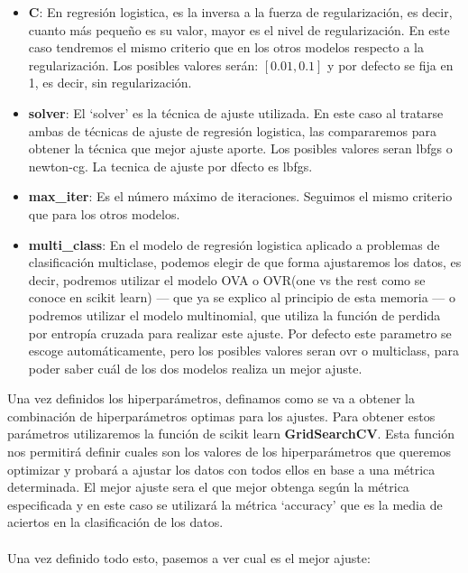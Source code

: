 \begin{itemize}
   \begin{itemize}
      \item \textbf{C}: En regresión logistica, es la inversa a la fuerza de regularización, es decir, cuanto más pequeño es su valor, mayor es el nivel de regularización. En este caso tendremos el mismo criterio que en los otros modelos respecto a la regularización. Los posibles valores serán: $[0.01, 0.1]$ y por defecto se fija en 1, es decir, sin regularización.
      \item \textbf{solver}: El `solver' es la técnica de ajuste utilizada. En este caso al tratarse ambas de técnicas de ajuste de regresión logistica, las compararemos para obtener la técnica que mejor ajuste aporte. Los posibles valores seran lbfgs o newton-cg. La tecnica de ajuste por dfecto es lbfgs.
      \item \textbf{max\_iter}: Es el número máximo de iteraciones. Seguimos el mismo criterio que para los otros modelos.
      \item \textbf{multi\_class}: En el modelo de regresión logistica aplicado a problemas de clasificación multiclase, podemos elegir de que forma ajustaremos los datos, es decir, podremos utilizar el modelo OVA o OVR(one vs the rest como se conoce en scikit learn) --- que ya se explico al principio de esta memoria --- o podremos utilizar el modelo multinomial, que utiliza la función de perdida por entropía cruzada para realizar este ajuste. Por defecto este parametro se escoge automáticamente, pero los posibles valores seran ovr o multiclass, para poder saber cuál de los dos modelos realiza un mejor ajuste.
   \end{itemize}
\end{itemize}

Una vez definidos los hiperparámetros, definamos como se va a obtener la combinación de hiperparámetros optimas para los ajustes. Para obtener estos parámetros utilizaremos la función de scikit learn \textbf{GridSearchCV}\cite{GridSearchCV}. Esta función nos permitirá definir cuales son los valores de los hiperparámetros que queremos optimizar y probará a ajustar los datos con todos ellos en base a una métrica determinada. El mejor ajuste sera el que mejor obtenga según la métrica especificada y en este caso se utilizará la métrica `accuracy'\cite{Accuracy} que es la media de aciertos en la clasificación de los datos.
\\\\
Una vez definido todo esto, pasemos a ver cual es el mejor ajuste:

